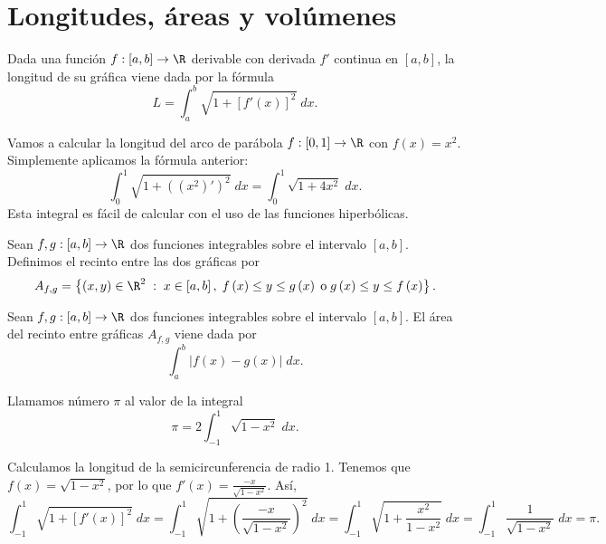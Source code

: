 \section{Longitudes, áreas y volúmenes}
\begin{ftheorem}[]
	\normalfont Dada una función $\displaystyle f : \left[a,b\right] \to \R $ derivable con derivada $\displaystyle f' $ continua en $\displaystyle \left[a,b\right]  $, la longitud de su gráfica viene dada por la fórmula 
	\[L = \int^{b}_{a} \sqrt{1 + \left[f'\left(x\right)\right] ^{2}} \; dx .\]
\end{ftheorem}
\begin{eg}
	\normalfont Vamos a calcular la longitud del arco de parábola $\displaystyle f : \left[0,1\right] \to \R $ con $\displaystyle f\left(x\right) = x^{2} $. Simplemente aplicamos la fórmula anterior:
	\[\int^{1}_{0} \sqrt{1 + \left(\left(x^{2}\right)'\right)^{2}} \; dx = \int^{1}_{0} \sqrt{1 + 4x^{2}} \; dx .\]
	Esta integral es fácil de calcular con el uso de las funciones hiperbólicas.
\end{eg}
\begin{fdefinition}[]
	\normalfont Sean $\displaystyle f,g : \left[a,b\right] \to \R $ dos funciones integrables sobre el intervalo $\displaystyle \left[a,b\right]  $. Definimos el recinto entre las dos gráficas por
	\[A_{f,g} = \left\{ \left(x,y\right) \in \R^{2} \; : \; x \in \left[a,b\right] , \; f\left(x\right) \leq y \leq g\left(x\right) \; \text{o}\; g\left(x\right) \leq y \leq f\left(x\right)\right\}  .\]
\end{fdefinition}
\begin{ftheorem}[]
	\normalfont Sean $\displaystyle f,g : \left[a,b\right] \to \R $ dos funciones integrables sobre el intervalo $\displaystyle \left[a,b\right]  $. El área del recinto entre gráficas $\displaystyle A_{f,g} $ viene dada por
	\[\int^{b}_{a} \left|f\left(x\right)-g\left(x\right)\right| \; dx .\]
\end{ftheorem}
\begin{fdefinition}[ $\displaystyle \pi $ ]
\normalfont Llamamos número $\displaystyle \pi  $ al valor de la integral 
\[ \pi = 2\int^{1}_{-1} \sqrt{1-x^{2}} \; dx .\]
\end{fdefinition}
\begin{eg}
\normalfont Calculamos la longitud de la semicircunferencia de radio 1. Tenemos que $\displaystyle f\left(x\right) = \sqrt{1 - x^{2}} $, por lo que $\displaystyle f'\left(x\right) = \frac{-x}{\sqrt{1 - x^{2}}} $. Así,
\[\int^{1}_{-1} \sqrt{1 + \left[f'\left(x\right)\right] ^{2}} \; dx = \int^{1}_{-1} \sqrt{1 + \left(\frac{-x}{\sqrt{1 - x^{2}}}\right)^{2}} \; dx = \int^{1}_{-1} \sqrt{1 + \frac{x^{2}}{1 - x^{2}}} \; dx = \int^{1}_{-1} \frac{1}{\sqrt{1 - x^{2}}} \; dx = \pi .\]
\end{eg}
